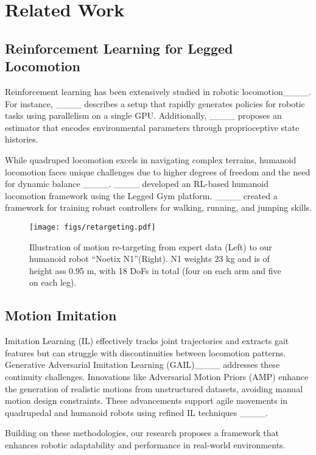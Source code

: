 \section{Related Work}
\label{sec:Related Work}
\subsection{Reinforcement Learning for Legged Locomotion}
Reinforcement learning has been extensively studied in robotic 
locomotion____.%
For instance, ____ describes a setup that rapidly generates policies for robotic tasks using parallelism on a single GPU. Additionally, ____ proposes an estimator that encodes environmental parameters through proprioceptive state histories.

While quadruped locomotion excels in navigating complex terrains, 
humanoid locomotion faces unique challenges due to 
higher degrees of freedom and the need for dynamic balance ____.
____ developed an RL-based humanoid 
locomotion framework using the Legged Gym platform.
 ____ created a framework 
for training robust controllers for walking, 
running, and jumping skills. 

\begin{figure}[t]
        \centering
        \texttt{[image: figs/retargeting.pdf]}
        \caption{ \small 
        Illustration of motion re-targeting from expert data (Left) to 
        our humanoid robot ``Noetix N1''(Right). 
        N1 weights 23 kg and is of height ass 0.95 m, with 18 DoFs in total (four on each arm and five on each leg).
        }
        \label{fig:retarget}
        \vspace{-6mm}
\end{figure}

\subsection{Motion Imitation}
\tonghe{ 
}
Imitation Learning (IL) effectively tracks joint trajectories and extracts gait features but can struggle with discontinuities between locomotion patterns.
Generative Adversarial Imitation Learning (GAIL)____ addresses these continuity challenges. 
Innovations like Adversarial Motion Priors (AMP) enhance the generation of realistic motions from unstructured datasets, 
avoiding manual motion design constraints. 
These advancements support agile movements in quadrupedal and humanoid robots using refined 
IL techniques ____.

Building on these methodologies, our research proposes a framework that enhances robotic adaptability and performance in real-world environments.